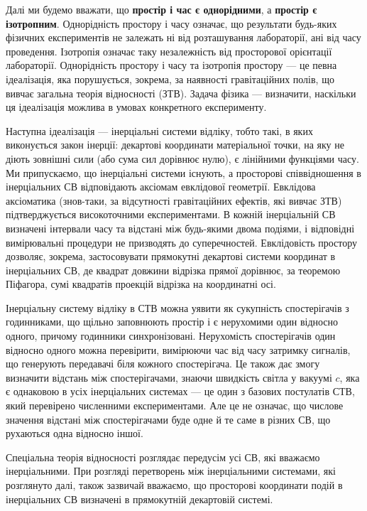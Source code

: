 Далі ми будемо вважати, що \textbf{простір і час є однорідними}, а \textbf{простір є ізотропним}. Однорідність простору і часу означає, що результати будь-яких фізичних експериментів не залежать ні від розташування лабораторії, ані від часу проведення. Ізотропія означає таку незалежність від просторової орієнтації лабораторії. Однорідність простору і часу та ізотропія простору --- це певна ідеалізація, яка порушується, зокрема, за наявності гравітаційних полів, що вивчає загальна теорія відносності (ЗТВ). Задача фізика --- визначити, наскільки ця ідеалізація можлива в умовах конкретного експерименту.

Наступна ідеалізація --- інерціальні системи відліку, тобто такі, в яких виконується закон інерції: декартові координати матеріальної точки, на яку не діють зовнішні сили (або сума сил дорівнює нулю), є лінійними функціями часу. Ми припускаємо, що інерціальні системи існують, а просторові співвідношення в інерціальних СВ відповідають аксіомам евклідової геометрії. Евклідова аксіоматика (знов-таки, за відсутності гравітаційних ефектів, які вивчає ЗТВ) підтверджується високоточними експериментами. В кожній інерціальній СВ визначені інтервали часу та відстані між будь-якими двома подіями, і відповідні вимірювальні процедури не призводять до суперечностей. Евклідовість простору дозволяє, зокрема, застосовувати прямокутні декартові системи координат в інерціальних СВ, де квадрат довжини відрізка прямої дорівнює, за теоремою Піфагора, сумі квадратів проекцій відрізка на координатні осі.

Інерціальну систему відліку в СТВ можна уявити як сукупність спостерігачів з годинниками, що щільно заповнюють простір і є нерухомими один відносно одного, причому годинники синхронізовані. Нерухомість спостерігачів один відносно одного можна перевірити, вимірюючи час від часу затримку сигналів, що генерують передавачі біля кожного спостерігача. Це також дає змогу визначити відстань між спостерігачами, знаючи швидкість світла у вакуумі $c$, яка є однаковою в усіх інерціальних системах --- це один з базових постулатів СТВ, який перевірено численними експериментами. Але це не означає, що числове значення відстані між спостерігачами буде одне й те саме в різних СВ, що рухаються одна відносно іншої.

Спеціальна теорія відносності розглядає передусім усі СВ, які вважаємо інерціальними. При розгляді перетворень між інерціальними системами, які розглянуто далі, також зазвичай вважаємо, що просторові координати подій в інерціальних СВ визначені в прямокутній декартовій системі.

